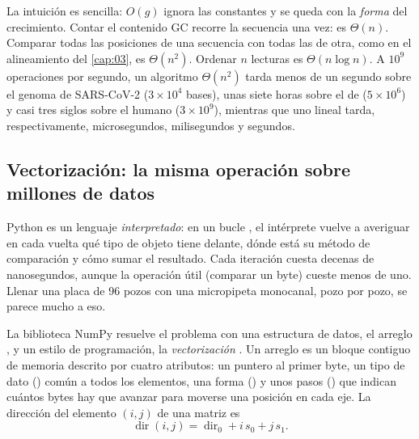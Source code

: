 \begin{simbolos}
\end{simbolos}

La intuición es sencilla: $O(g)$ ignora las constantes y se queda con la \emph{forma} del crecimiento. Contar el contenido GC recorre la secuencia una vez: es $\Theta(n)$. Comparar todas las posiciones de una secuencia con todas las de otra, como en el alineamiento del \cref{cap:03}, es $\Theta(n^2)$. Ordenar $n$ lecturas es $\Theta(n\log n)$. A $10^9$ operaciones por segundo, un algoritmo $\Theta(n^2)$ tarda menos de un segundo sobre el genoma de SARS-CoV-2 ($3\times10^4$ bases), unas siete horas sobre el de  ($5\times10^6$) y casi tres siglos sobre el humano ($3\times10^9$), mientras que uno lineal tarda, respectivamente, microsegundos, milisegundos y segundos.

\subsection{Vectorización: la misma operación sobre millones de datos}

Python es un lenguaje \emph{interpretado}: en un bucle , el intérprete vuelve a averiguar en cada vuelta qué tipo de objeto tiene delante, dónde está su método de comparación y cómo sumar el resultado. Cada iteración cuesta decenas de nanosegundos, aunque la operación útil (comparar un byte) cueste menos de uno. Llenar una placa de 96 pozos con una micropipeta monocanal, pozo por pozo, se parece mucho a eso.

La biblioteca NumPy resuelve el problema con una estructura de datos, el arreglo , y un estilo de programación, la \emph{vectorización} \parencite{c00-harris2020}. Un arreglo es un bloque contiguo de memoria descrito por cuatro atributos: un puntero al primer byte, un tipo de dato () común a todos los elementos, una forma () y unos pasos () que indican cuántos bytes hay que avanzar para moverse una posición en cada eje. La dirección del elemento $(i,j)$ de una matriz es
\begin{equation}\label{eq:00-strides}
\operatorname{dir}(i,j) = \operatorname{dir}_0 + i\,s_0 + j\,s_1 .
\end{equation}


